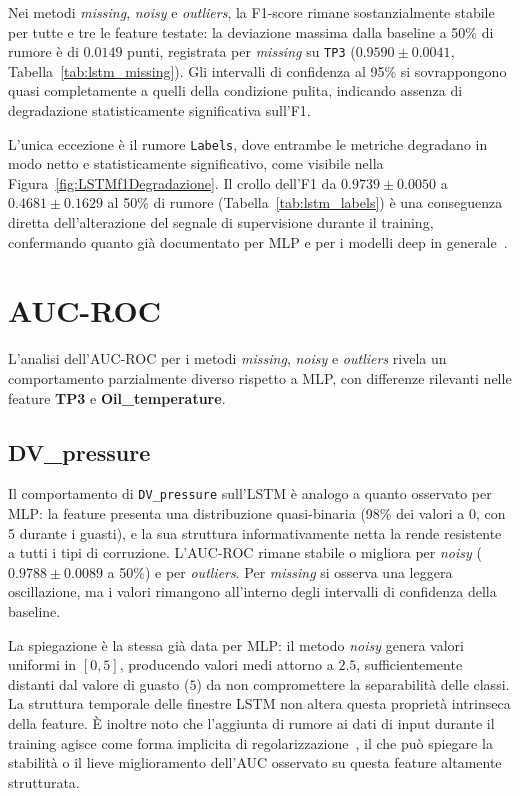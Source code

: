 \documentclass[../main.tex]{subfiles}
\begin{document}
Nei metodi \textit{missing}, \textit{noisy} e \textit{outliers}, la F1-score rimane sostanzialmente stabile per tutte e tre le feature testate: la deviazione massima dalla baseline a 50\% di rumore è di $0.0149$ punti, registrata per \textit{missing} su \texttt{TP3} ($0.9590 \pm 0.0041$, Tabella~\ref{tab:lstm_missing}). Gli intervalli di confidenza al 95\% si sovrappongono quasi completamente a quelli della condizione pulita, indicando assenza di degradazione statisticamente significativa sull'F1.

L'unica eccezione è il rumore \texttt{Labels}, dove entrambe le metriche degradano in modo netto e statisticamente significativo, come visibile nella Figura~\ref{fig:LSTMf1Degradazione}. Il crollo dell'F1 da $0.9739 \pm 0.0050$ a $0.4681 \pm 0.1629$ al 50\% di rumore (Tabella~\ref{tab:lstm_labels}) è una conseguenza diretta dell'alterazione del segnale di supervisione durante il training, confermando quanto già documentato per MLP e per i modelli deep in generale~\cite{zhang2017understandingdeeplearningrequires}.

\section{AUC-ROC}

L'analisi dell'AUC-ROC per i metodi \textit{missing}, \textit{noisy} e \textit{outliers} rivela un comportamento parzialmente diverso rispetto a MLP, con differenze rilevanti nelle feature \textbf{TP3} e \textbf{Oil\_temperature}.

\subsection{DV\_pressure}
Il comportamento di \texttt{DV\_pressure} sull'LSTM è analogo a quanto osservato per MLP: la feature presenta una distribuzione quasi-binaria (98\% dei valori a 0, con 5 durante i guasti), e la sua struttura informativamente netta la rende resistente a tutti i tipi di corruzione. L'AUC-ROC rimane stabile o migliora per \textit{noisy} ($0.9788 \pm 0.0089$ a 50\%) e per \textit{outliers}. Per \textit{missing} si osserva una leggera oscillazione, ma i valori rimangono all'interno degli intervalli di confidenza della baseline.

La spiegazione è la stessa già data per MLP: il metodo \textit{noisy} genera valori uniformi in $[0, 5]$, producendo valori medi attorno a $2.5$, sufficientemente distanti dal valore di guasto ($5$) da non compromettere la separabilità delle classi. La struttura temporale delle finestre LSTM non altera questa proprietà intrinseca della feature. È inoltre noto che l'aggiunta di rumore ai dati di input durante il training agisce come forma implicita di regolarizzazione~\cite{bishop1995training}, il che può spiegare la stabilità o il lieve miglioramento dell'AUC osservato su questa feature altamente strutturata.
\end{document}
